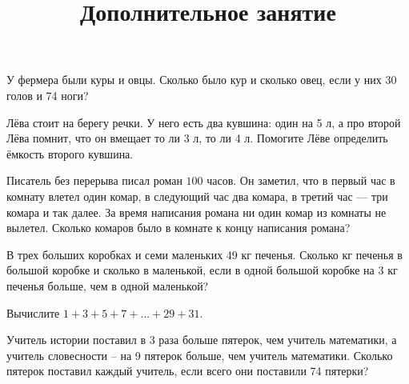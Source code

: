 %	
%	
%	
%	
\newpage
\title{Дополнительное занятие}
\begin{listofex}
	\item У фермера были куры и овцы. Сколько было кур и сколько овец, если у
	них 30 голов и 74 ноги?
	\item Лёва стоит на берегу речки. У него есть два кувшина: один на 5 л, а про второй Лёва помнит, что он вмещает то ли 3 л, то ли 4 л. Помогите Лёве определить ёмкость второго
	кувшина.
	\item Писатель без перерыва писал роман \( 100 \) часов. Он заметил, что в первый час в комнату влетел один комар, в следующий час два комара, в третий час --- три комара и так далее. За время написания романа ни один комар из комнаты не вылетел. Сколько комаров было в комнате к концу написания романа?
	\item В трех больших коробках и семи маленьких 49 кг печенья. Сколько кг печенья в большой коробке и сколько в маленькой, если в одной большой коробке на 3 кг печенья больше, чем в
	одной маленькой?
	\item Вычислите \( 1+3+5+7+...+29+31 \).
	\item Учитель истории поставил в 3 раза больше пятерок, чем учитель математики, а учитель
	словесности – на 9 пятерок больше, чем учитель математики. Сколько пятерок поставил
	каждый учитель, если всего они поставили 74 пятерки?
\end{listofex}